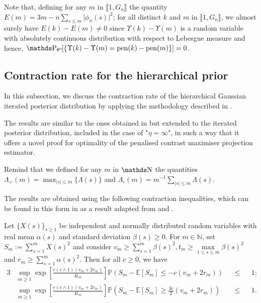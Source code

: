 \medskip

Note that, defining for any $m$ in $\llbracket 1, G_{n} \rrbracket$ the quantity $E(m) = 3 m - n \sum\nolimits_{s \leq m}\vert \phi_{n}(s) \vert^{2}$; for all distinct $k$ and $m$ in $\llbracket 1, G_{n} \rrbracket$, we almost surely have $E(k) - E(m) \neq 0$ since $\Upsilon(k) - \Upsilon(m)$ is a random variable with absolutely continuous distribution with respect to Lebesgue measure and hence, $\P_{\theta^{\circ}}\!\!\left[\{\Upsilon(k) - \Upsilon(m) = \pen(k) - \pen(m)\}\right] = 0$.

\subsection{Contraction rate for the hierarchical prior}\label{BAYES_GAUSS_CONTRACT_HIERARCHICAL}

In this subsection, we discuss the contraction rate of the hierarchical Gaussian iterated posterior distribution by applying the methodology described in .

The results are similar to the ones obtained in  but extended to the iterated posterior distribution, included in the case of "$\eta = \infty$", in such a way that it offers a novel proof for optimality of the penalised contrast maximiser projection estimator.

Remind that we defined for any $m$ in $\N$ the quantities $\Lambda_{+}(m) = \max_{\vert s \vert \leq m}\{\Lambda(s)\}$ and $\Lambda_{\circ}(m) = m^{-1} \sum_{\vert s \vert \leq m}\Lambda(s)$.

The results are obtained using the following contraction inequalities, which can be found in this form in  as a result adapted from  and .
\begin{lm}\label{BAYES_GAUSS_CONTRACT_HIERARCHICAL_LM_PROB}\label{lmA.1.1}
Let $\{X(s)\}_{s \geq 1}$ be independent and normally distributed random variables with real mean $\alpha(s)$ and standard deviation $\beta(s) \geq 0$. For $m \in \mathds{N}$, set $S_{m} := \sum \limits_{s = 1}^{m} X(s)^{2}$ and consider $v_{m} \geq \sum\limits_{s = 1}^{m} \beta(s)^{2}, t_{m} \geq \max \limits_{1 \leq s \leq m} \beta(s)^{2}$ and $r_{m} \geq \sum\limits_{s = 1}^{m} \alpha(s)^{2}$.
Then for all $c \geq 0$, we have
\begin{alignat*}{3}
&\sup\limits_{m \geq 1} \exp\left[\frac{c (c \wedge 1) (v_{m} + 2 r_{m})}{4 t_{m}}\right]\mathds{P}\left(S_{m} - \mathds{E}[S_{m}] \leq - c (v_{m} + 2 r_{m})\right) &&\leq&& 1; \\
&\sup\limits_{m \geq 1} \exp\left[\frac{c (c \wedge 1) (v_{m} + 2 r_{m})}{4 t_{m}}\right]\mathds{P}\left(S_{m} - \mathds{E}[S_{m}] \geq \frac{3 c}{2} (v_{m} + 2 r_{m})\right) &&\leq&& 1.
\end{alignat*}
\reEnd
\end{lm}

